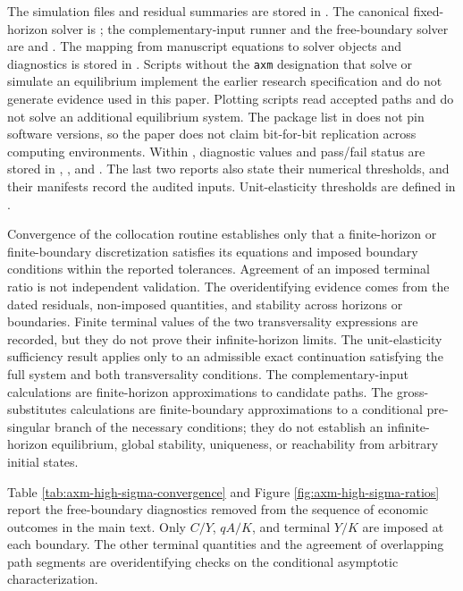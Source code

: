 The simulation files and residual summaries are stored in
. The canonical fixed-horizon solver is
; the complementary-input runner and
the free-boundary solver are
 and
. The mapping from manuscript
equations to solver objects and diagnostics is stored in
. Scripts without the
\texttt{axm} designation that solve or simulate an equilibrium implement the
earlier research specification and do not generate evidence used in this paper.
Plotting scripts read accepted paths and do not solve an additional equilibrium
system.
The package list in  does not pin software
versions, so the paper does not claim bit-for-bit replication across computing
environments.
Within , diagnostic values and pass/fail status are stored in
, , and
. The last two reports
also state their numerical thresholds, and their manifests record the audited
inputs. Unit-elasticity thresholds are defined in
.

Convergence of the collocation routine establishes only that a finite-horizon or
finite-boundary discretization satisfies its equations and imposed boundary
conditions within the reported tolerances. Agreement of an imposed terminal
ratio is not independent validation. The overidentifying evidence comes from the
dated residuals, non-imposed quantities, and stability across horizons or
boundaries. Finite terminal values of the two transversality expressions are
recorded, but they do not prove their infinite-horizon limits. The
unit-elasticity sufficiency result applies only to an admissible exact continuation
satisfying the full system and both transversality conditions. The
complementary-input calculations are finite-horizon approximations to candidate
paths. The
gross-substitutes calculations are finite-boundary approximations to a
conditional pre-singular branch of the necessary conditions; they do not establish
an infinite-horizon equilibrium, global stability, uniqueness, or reachability
from arbitrary initial states.

Table \ref{tab:axm-high-sigma-convergence} and Figure
\ref{fig:axm-high-sigma-ratios} report the free-boundary diagnostics removed from
the sequence of economic outcomes in the main text. Only \(C/Y\), \(qA/K\), and
terminal \(Y/K\) are imposed at each boundary. The other terminal quantities and
the agreement of overlapping path segments are overidentifying checks on the
conditional asymptotic characterization.


